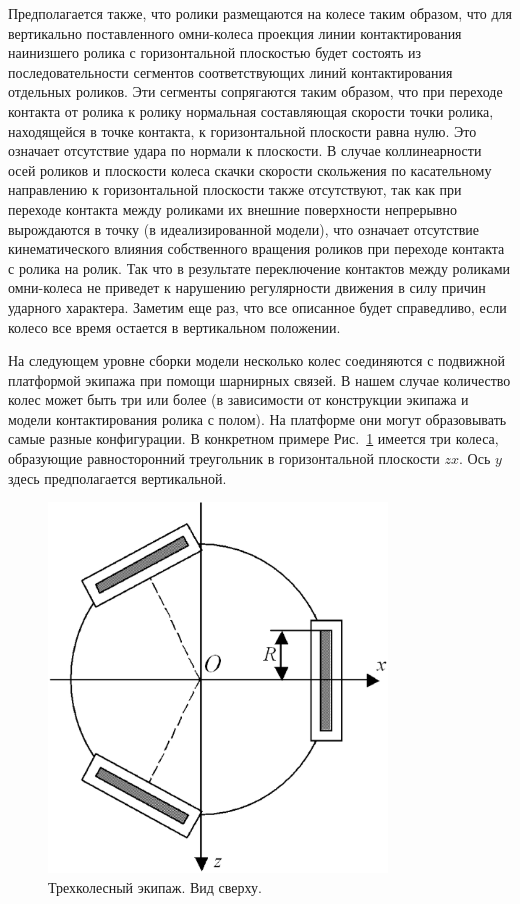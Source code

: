 \documentclass[12pt,a4paper]{article}
\begin{document}
Предполагается также, что ролики размещаются на колесе таким образом, что для 
вертикально поставленного омни-колеса проекция линии контактирования наинизшего 
ролика с горизонтальной плоскостью будет состоять из последовательности 
сегментов соответствующих линий контактирования отдельных роликов. Эти сегменты 
сопрягаются таким образом, что при переходе контакта от ролика к ролику 
нормальная составляющая скорости точки ролика, находящейся в точке контакта, к 
горизонтальной плоскости равна нулю. Это означает отсутствие удара по нормали к 
плоскости. В случае коллинеарности осей роликов и плоскости колеса скачки 
скорости скольжения по касательному направлению к горизонтальной плоскости 
также отсутствуют, так как при переходе контакта между роликами их внешние 
поверхности непрерывно вырождаются в точку (в идеализированной модели), что 
означает отсутствие кинематического влияния собственного вращения роликов при 
переходе контакта с ролика на ролик. Так что в результате переключение 
контактов между роликами омни-колеса не приведет к нарушению регулярности 
движения в силу причин ударного характера. Заметим еще раз, что все описанное 
будет справедливо, если колесо все время остается в вертикальном положении.

На следующем уровне сборки модели несколько колес соединяются с подвижной 
платформой экипажа при помощи шарнирных связей. В нашем случае количество колес 
может быть три или более (в зависимости от конструкции экипажа и модели 
контактирования ролика с полом). На платформе они могут образовывать самые 
разные конфигурации. В конкретном примере Рис.~\ref{Vehicle} имеется три 
колеса, образующие равносторонний треугольник в горизонтальной плоскости $zx$. 
Ось $y$ здесь предполагается вертикальной.
\begin{figure}[htb]
\centering\includegraphics[width=9cm]{Vehicle.eps}
\caption{Трехколесный экипаж. Вид сверху.}
\label{Vehicle}
\end{figure}
\end{document}
